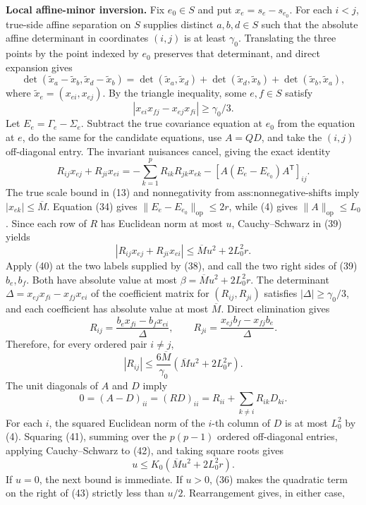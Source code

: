 \textbf{Local affine-minor inversion.}
Fix \(e_0\in S\) and put \(x_e=s_e-s_{e_0}\). For each \(i<j\), true-side affine separation on \(S\) supplies distinct \(a,b,d\in S\) such that the absolute affine determinant in coordinates \((i,j)\) is at least \(\gamma_0\). Translating the three points by the point indexed by \(e_0\) preserves that determinant, and direct expansion gives
\[
\det(\widetilde x_a-\widetilde x_b,
\widetilde x_d-\widetilde x_b)
=\det(\widetilde x_a,\widetilde x_d)
+\det(\widetilde x_d,\widetilde x_b)
+\det(\widetilde x_b,\widetilde x_a),
\tag{37}
\]
where \(\widetilde x_e=(x_{ei},x_{ej})\). By the triangle inequality, some \(e,f\in S\) satisfy
\[
|x_{ei}x_{fj}-x_{ej}x_{fi}|\geq\gamma_0/3.
\tag{38}
\]
Let \(E_e=\Gamma_e-\Sigma_e\). Subtract the true covariance equation at \(e_0\) from the equation at \(e\), do the same for the candidate equations, use \(A=QD\), and take the \((i,j)\) off-diagonal entry. The invariant nuisances cancel, giving the exact identity
\[
R_{ij}x_{ej}+R_{ji}x_{ei}
=-\sum_{k=1}^pR_{ik}R_{jk}x_{ek}
-[A(E_e-E_{e_0})A^{\mathsf T}]_{ij}.
\tag{39}
\]
The true scale bound in (13) and nonnegativity from \(\text{ass:nonnegative-shifts}\) imply \(|x_{ek}|\leq\overline M\). Equation (34) gives \(\|E_e-E_{e_0}\|_{\mathrm{op}}\leq2r\), while (4) gives \(\|A\|_{\mathrm{op}}\leq L_0\). Since each row of \(R\) has Euclidean norm at most \(u\), Cauchy--Schwarz in (39) yields
\[
|R_{ij}x_{ej}+R_{ji}x_{ei}|
\leq\overline M u^2+2L_0^2r.
\tag{40}
\]
Apply (40) at the two labels supplied by (38), and call the two right sides of (39) \(b_e,b_f\). Both have absolute value at most \(\beta=\overline M u^2+2L_0^2r\). The determinant \(\Delta=x_{ej}x_{fi}-x_{fj}x_{ei}\) of the coefficient matrix for \((R_{ij},R_{ji})\) satisfies \(|\Delta|\geq\gamma_0/3\), and each coefficient has absolute value at most \(\overline M\). Direct elimination gives
\[
R_{ij}=\frac{b_ex_{fi}-b_fx_{ei}}{\Delta},
\qquad
R_{ji}=\frac{x_{ej}b_f-x_{fj}b_e}{\Delta}.
\]
Therefore, for every ordered pair \(i\ne j\),
\[
|R_{ij}|
\leq\frac{6\overline M}{\gamma_0}
\left(\overline M u^2+2L_0^2r\right).
\tag{41}
\]
The unit diagonals of \(A\) and \(D\) imply
\[
0=(A-D)_{ii}=(RD)_{ii}
=R_{ii}+\sum_{k\ne i}R_{ik}D_{ki}.
\tag{42}
\]
For each \(i\), the squared Euclidean norm of the \(i\)-th column of \(D\) is at most \(L_0^2\) by (4). Squaring (41), summing over the \(p(p-1)\) ordered off-diagonal entries, applying Cauchy--Schwarz to (42), and taking square roots gives
\[
u\leq K_0\left(\overline M u^2+2L_0^2r\right).
\tag{43}
\]
If \(u=0\), the next bound is immediate. If \(u>0\), (36) makes the quadratic term on the right of (43) strictly less than \(u/2\). Rearrangement gives, in either case,
